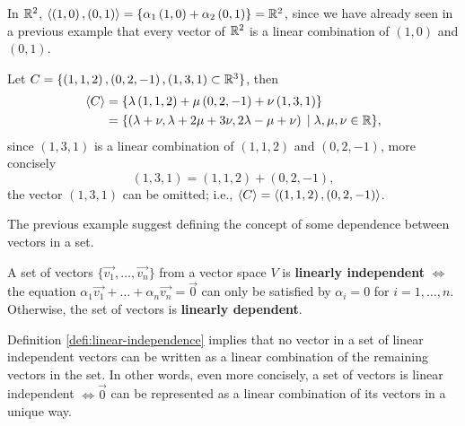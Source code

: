 \begin{example}
    In $\R^2$, $\gen{\left( 1, 0 \right) , \left( 0, 1 \right) } = \{\alpha_1\left( 1, 0 \right) +
    \alpha_2\left( 0, 1 \right) \} = \R^2 $, since we have already seen in a previous example that every
    vector of $\R^2$ is a linear combination of $\left( 1, 0 \right) $ and $\left( 0, 1 \right) $.
\end{example}

\begin{example}
    Let $C = \{\left( 1, 1, 2 \right), \left( 0, 2, -1 \right), \left( 1, 3, 1 \right) \subset\R^3\} $, then
    \begin{align}
        \gen{C} &= \{\lambda\left( 1, 1, 2 \right) + \mu\left( 0, 2, -1 \right) + \nu\left( 1, 3, 1 \right)\}
             \\ &= \{\left( \lambda + \nu, \lambda + 2\mu + 3\nu, 2\lambda - \mu + \nu \right) \st\lambda,
              \mu, \nu\in\R\},
    \end{align}
    since $\left( 1, 3, 1 \right) $ is a linear combination of $\left( 1, 1, 2 \right) $ and $\left( 0, 2, -1
    \right) $, more concisely
    \begin{equation}
        \left( 1, 3, 1 \right) = \left( 1, 1, 2 \right) + \left( 0, 2, -1 \right),
    \end{equation}
    the vector $\left( 1, 3, 1 \right) $ can be omitted; i.e., $\langle C \rangle = \langle \left( 1, 1, 2 \right), \left(
    0, 2, -1\right)  \rangle$.
\end{example}

The previous example suggest defining the concept of some dependence between vectors in a set.

\begin{defn} \label{defi:linear-independence}
    A set of vectors $\{\vec{v_1}, \ldots, \vec{v_n}\} $ from a vector space $V$ is \textbf{linearly
    independent} $\iff$ the equation $\alpha_1\vec{v_1} + \ldots + \alpha_n\vec{v_n} = \vec{0}$ can only
    be satisfied by $\alpha_i = 0$ for $i = 1, \ldots, n$. Otherwise, the set of vectors is
    \textbf{linearly dependent}.
\end{defn}

\begin{remark}
    Definition \ref{defi:linear-independence} implies that no vector in a set of linear independent vectors can be written as a linear combination of the remaining vectors in the set. In other words, even more concisely, a set of vectors is linear independent $\iff\vec{0}$ can be represented as a linear combination of its vectors in a unique way.
\end{remark}

